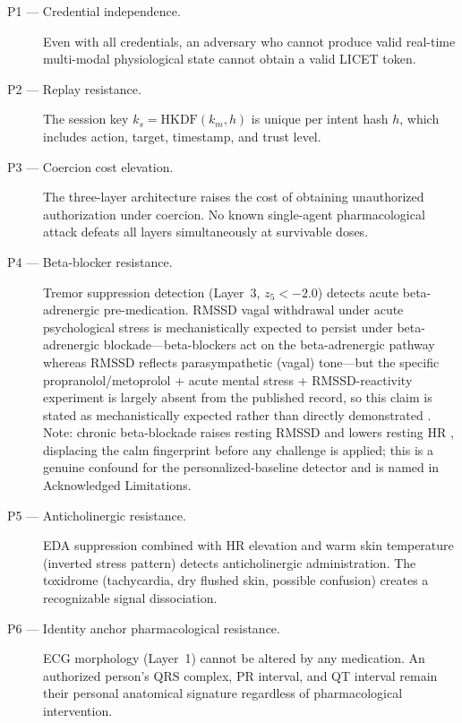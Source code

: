 \documentclass[12pt,a4paper]{article}
\begin{document}
\begin{description}
  \item[P1 — Credential independence.] Even with all credentials, an adversary
  who cannot produce valid real-time multi-modal physiological state cannot
  obtain a valid LICET token.

  \item[P2 — Replay resistance.] The session key $k_s = \text{HKDF}(k_m, h)$
  is unique per intent hash $h$, which includes action, target, timestamp, and
  trust level.

  \item[P3 — Coercion cost elevation.] The three-layer architecture raises the
  cost of obtaining unauthorized authorization under coercion. No known
  single-agent pharmacological attack defeats all layers simultaneously at
  survivable doses.

  \item[P4 — Beta-blocker resistance.] Tremor suppression detection (Layer~3,
  $z_5 < -2.0$) detects acute beta-adrenergic pre-medication. RMSSD vagal
  withdrawal under acute psychological stress is mechanistically expected to
  persist under beta-adrenergic blockade---beta-blockers act on the
  beta-adrenergic pathway whereas RMSSD reflects parasympathetic (vagal)
  tone---but the specific propranolol/metoprolol + acute mental stress +
  RMSSD-reactivity experiment is largely absent from the published record, so
  this claim is stated as mechanistically expected rather than directly
  demonstrated \cite{steptoe2018betablocker}. Note: chronic beta-blockade
  raises resting RMSSD and lowers resting HR \cite{lampert2003betablocker},
  displacing the calm fingerprint before any challenge is applied; this is a
  genuine confound for the personalized-baseline detector and is named in
  Acknowledged Limitations.

  \item[P5 — Anticholinergic resistance.] EDA suppression combined with HR
  elevation and warm skin temperature (inverted stress pattern) detects
  anticholinergic administration. The toxidrome (tachycardia, dry flushed
  skin, possible confusion) creates a recognizable signal dissociation.

  \item[P6 — Identity anchor pharmacological resistance.] ECG morphology
  (Layer~1) cannot be altered by any medication. An authorized person's QRS
  complex, PR interval, and QT interval remain their personal anatomical
  signature regardless of pharmacological intervention.


\end{description}
\end{document}
